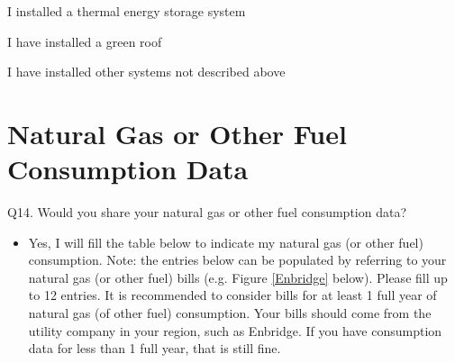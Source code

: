 \documentclass[12pt]{article}
\begin{document}
\begin{Form}
 I installed a thermal energy storage system \\
	
 I have installed a green roof \\
	
 I have installed other systems not described above \\
\end{Form}

\pagebreak

\section{Natural Gas or Other Fuel Consumption Data}

Q14. Would you share your natural gas or other fuel consumption data?

\begin{itemize}
\item Yes, I will fill the table below to indicate my natural gas (or other fuel) consumption. Note: the entries below can be populated by referring to your natural gas (or other fuel) bills (e.g. Figure \ref{Enbridge} below). Please fill up to 12 entries. It is recommended to consider bills for at least 1 full year of natural gas (of other fuel) consumption. Your bills should come from the utility company in your region, such as Enbridge. If you have consumption data for less than 1 full year, that is still fine.
\end{itemize}
\end{document}
